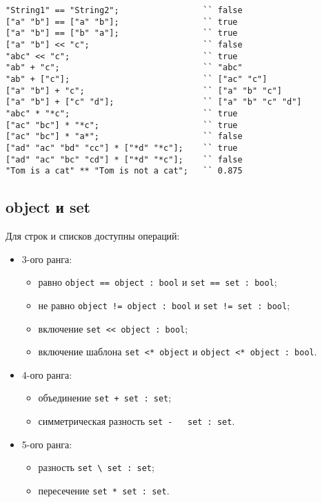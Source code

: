 \documentclass[a4paper, 14pt]{extarticle}
\newenvironment{icItems}
	{ \begin{itemize} [noitemsep,nolistsep] }
	{ \end{itemize} }
\begin{document}
\begin{lstlisting}[caption=Примеры использования операторов над данными типа string и list, label=stringlistopex]
"String1" == "String2";					`` false
["a" "b"] == ["a" "b"];					`` true
["a" "b"] == ["b" "a"];					`` true
["a" "b"] << "c";						`` false
"abc" << "c";							`` true
"ab" + "c";								`` "abc"
"ab" + ["c"];							`` ["ac" "c"]
["a" "b"] + "c";						`` ["a" "b" "c"]
["a" "b"] + ["c" "d"];					`` ["a" "b" "c" "d"]
"abc" * "*c";							`` true
["ac" "bc"] * "*c";						`` true
["ac" "bc"] * "a*";						`` false
["ad" "ac" "bd" "cc"] * ["*d" "*c"];	`` true
["ad" "ac" "bc" "cd"] * ["*d" "*c"];	`` false
"Tom is a cat" ** "Tom is not a cat";	`` 0.875
\end{lstlisting}

\subsection{{\color{bluemarin}object} и {\color{bluemarin}set}}

	Для строк и списков доступны операций:
\begin{icItems}
	\item 3-ого ранга:
		\begin{icItems}
		\item равно \lstinline`object == object : bool` и \lstinline`set == set : bool`;
		\item не равно \lstinline`object != object : bool` и \lstinline`set != set : bool`;
		\item включение \lstinline`set << object : bool`;
		\item включение шаблона \lstinline`set <* object` и \lstinline`object <* object : bool`.
		\end{icItems}
	\item 4-ого ранга:
		\begin{icItems}
		\item объединение \lstinline`set + set : set`;
		\item симметрическая разность \lstinline`set -   set : set`.
		\end{icItems}
	\item 5-ого ранга:
		\begin{icItems}
		\item разность \lstinline`set \ set : set`;
		\item пересечение \lstinline`set * set : set`.
		\end{icItems}
\end{icItems}
\end{document}
